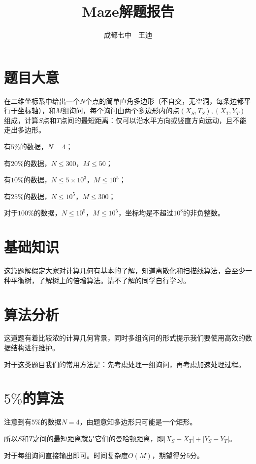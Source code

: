 \documentclass[a4paper]{article}
\begin{document}
\title{Maze解题报告}
\author{成都七中\ \  王迪}
\maketitle
\tableofcontents

\newpage

\section{题目大意}
在二维坐标系中给出一个$N$个点的简单直角多边形（不自交，无空洞，每条边都平行于坐标轴），和$M$组询问，每个询问由两个多边形内的点$(X_S,T_S),(X_T,Y_T)$组成，计算$S$点和$T$点间的最短距离：仅可以沿水平方向或竖直方向运动，且不能走出多边形。 \par
有$5\%$的数据，$N=4$； \par
有$20\%$的数据，$N \le 300$，$M \le 50$； \par
有$10\%$的数据，$N \le 5 \times 10^3$，$M \le 10^5$； \par
有$25\%$的数据，$N \le 10^5$，$M \le 300$； \par
对于$100\%$的数据，$N \le 10^5$，$M \le 10^5$，坐标均是不超过$10^8$的非负整数。

\section{基础知识}
这篇题解假定大家对计算几何有基本的了解，知道离散化和扫描线算法，会至少一种平衡树，了解树上的倍增算法。请不了解的同学自行学习。

\section{算法分析}
这道题有着比较浓的计算几何背景，同时多组询问的形式提示我们要使用高效的数据结构进行维护。 \par
对于这类题目我们的常用方法是：先考虑处理一组询问，再考虑加速处理过程。

\section{$5\%$的算法}
注意到有$5\%$的数据$N=4$，由题意知多边形只可能是一个矩形。 \par
所以$S$和$T$之间的最短距离就是它们的曼哈顿距离，即$|X_S-X_T|+|Y_S-Y_T|$。 \par
对于每组询问直接输出即可。时间复杂度$O(M)$，期望得分$5$分。
\end{document}
